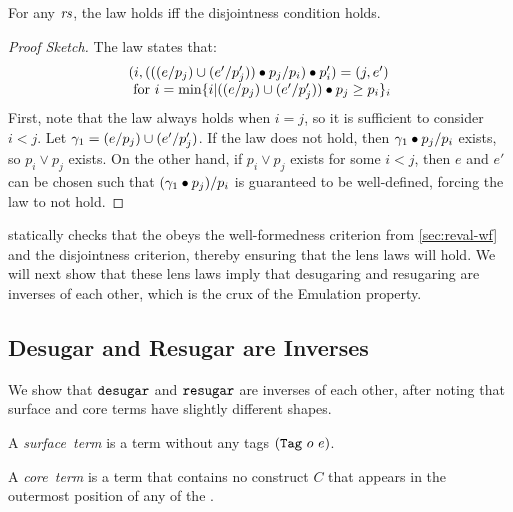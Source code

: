 \begin{theorem}
\label{thm:reval-putget}
For any {} $\mathit{rs}$, the {\Putget} law holds iff the disjointness
condition holds.
\end{theorem}
\begin{proof}[Proof Sketch]
The law states that:
\[\begin{array}{lcll}
(i, (((e / p_j) \cup (e' / p_j')) \bullet p_j / p_i) \bullet p_i')
  = (j, e') \\
   \text{ for $i = \text{min} \{i |
               ((e / p_j) \cup (e' / p_j')) \bullet p_j \geq p_i\}_i$}
\end{array}\]
First, note that the law always holds when $i = j$, so it is sufficient to
consider $i < j$. Let $\gamma_1 = (e / p_j) \cup (e' /
p_j')$. If the {\Putget} law does not hold, then $\gamma_1 \bullet p_j /
p_i$ exists, so $p_i \!\vee\! p_j$ exists. On the other hand, if $p_i \!\vee\!
p_j$ exists for some $i < j$, then $e$ and $e'$ can be chosen such that
$(\gamma_1 \bullet p_j) / p_i$ is guaranteed to be well-defined, forcing the
law to not hold.
\end{proof}


{\Resugarer} statically checks that the {} obeys the
well-formedness criterion from \cref{sec:reval-wf}
and the disjointness criterion, thereby ensuring
that the lens laws will hold. We will next show that these lens laws imply
that desugaring and resugaring are inverses of each
other, which is the crux of the Emulation property.


\subsection{Desugar and Resugar are Inverses}
\label{sec:reval-inverses}

We show that $\texttt{desugar}$ and $\texttt{resugar}$ are inverses of each
other, after noting that surface and core terms have slightly
different shapes.

\begin{definition}
A \emph{surface~term} is a term without any tags $(\texttt{Tag}\ o\ e)$.
\end{definition}
\begin{definition}
A \emph{core~term} is a term that contains no construct $C$ that appears
in the outermost position of any  of the {}.
\end{definition}

